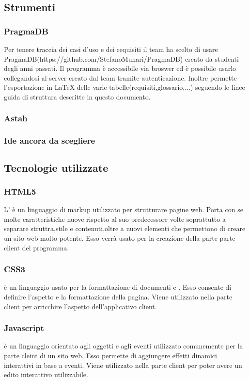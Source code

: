 	\subsection{Strumenti}
		\subsubsection{PragmaDB}
		Per tenere traccia dei casi d'uso e dei requisiti il team ha scelto di usare PragmaDB(https://github.com/StefanoMunari/PragmaDB) creato da studenti degli anni passati. Il programma è accessibile via broswer ed è possibile usarlo collegandosi al server creato dal team tramite autenticazione. Inoltre permette l'esportazione in \LaTeX{} delle varie tabelle(requisiti,glossario,...) seguendo le linee guida di struttura descritte in questo documento.
		\subsubsection{Astah}
		\subsubsection{Ide ancora da scegliere}
	\subsection{Tecnologie utilizzate}
	\subsubsection{HTML5}
	L' è un linguaggio di markup utilizzato per strutturare pagine web. Porta con se molte caratteristiche nuove rispetto al suo predecessore volte soprattutto a separare struttra,stile e contenuti,oltre a nuovi elementi che permettono di creare un sito web molto potente.
	Esso verrà usato per la creazione della parte parte client del programma.
	\subsubsection{CSS3}
	 è un linguaggio usato per la formattazione di documenti  e . Esso consente di definire l'aspetto e la formattazione della pagina. Viene utilizzato nella parte client per arricchire l'aspetto dell'applicativo client.
	\subsubsection{Javascript}
	 è un linguaggio orientato agli oggetti e agli eventi utilizzato comunemente per la parte cleint di un sito web. Esso permette di aggiungere effetti dinamici interattivi in base a eventi.
	Viene utilizzato nella parte client per poter avere un edito interattivo utilizzabile.%
